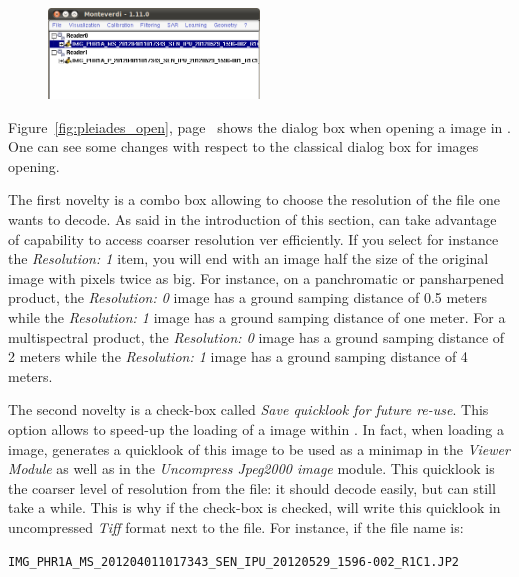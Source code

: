 \begin{figure}
  \center
  \includegraphics[width=0.5\textwidth]{../Art/MonteverdiImages/pleiades_monteverdi.png}
  \label{fig:pleiades_monteverdi}
\end{figure}

Figure~\ref{fig:pleiades_open}, page~\pageref{fig:pleiades_open} shows
the dialog box when opening a \phr image in \mont. One can see some
changes with respect to the classical dialog box for images opening.

The first novelty is a combo box allowing to choose the resolution of
the \jpg file one wants to decode. As said in the introduction of
this section, \otb can take advantage of \jpg capability to access
coarser resolution ver efficiently. If you select for instance
the \textit{Resolution: 1} item, you will end with an image half the
size of the original image with pixels twice as big. For instance, on
a \phr panchromatic or pansharpened product,
the \textit{Resolution: 0} image has a ground samping distance of
0.5 meters while the \textit{Resolution: 1} image has a ground
samping distance of one meter. For a multispectral product,
the \textit{Resolution: 0} image has a ground samping distance of 2
meters while the \textit{Resolution: 1} image has a ground samping
distance of 4 meters.

The second novelty is a check-box called \textit{Save quicklook for
future re-use}. This option allows to speed-up the loading of a
\phr image within \mont. In fact, when loading a \phr
image, \mont generates a quicklook of this image to be used as a
minimap in the \textit{Viewer Module} as well as in
the \textit{Uncompress Jpeg2000 image} module. This quicklook is the
coarser level of resolution from the \jpg file: it should decode
easily, but can still take a while. This is why if the check-box is
checked, \mont will write this quicklook in uncompressed \textit{Tiff}
format next to the \jpg file. For instance, if the file name  is:
\begin{scriptsize}
\begin{verbatim}
IMG_PHR1A_MS_201204011017343_SEN_IPU_20120529_1596-002_R1C1.JP2
\end{verbatim}
\end{scriptsize}

